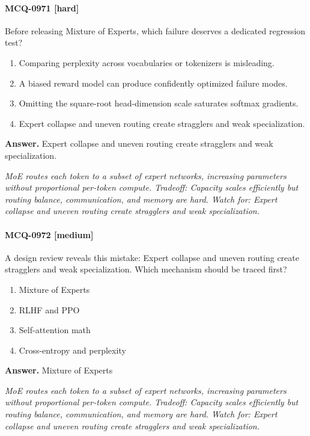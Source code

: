 \paragraph{MCQ-0971 [hard]} Before releasing Mixture of Experts, which failure deserves a dedicated regression test?
\begin{enumerate}[label=\Alph*.]
\item Comparing perplexity across vocabularies or tokenizers is misleading.
\item A biased reward model can produce confidently optimized failure modes.
\item Omitting the square-root head-dimension scale saturates softmax gradients.
\item Expert collapse and uneven routing create stragglers and weak specialization.
\end{enumerate}
\noindent\textbf{Answer.} Expert collapse and uneven routing create stragglers and weak specialization.
\par\textit{MoE routes each token to a subset of expert networks, increasing parameters without proportional per-token compute. Tradeoff: Capacity scales efficiently but routing balance, communication, and memory are hard. Watch for: Expert collapse and uneven routing create stragglers and weak specialization.}
\paragraph{MCQ-0972 [medium]} A design review reveals this mistake: Expert collapse and uneven routing create stragglers and weak specialization. Which mechanism should be traced first?
\begin{enumerate}[label=\Alph*.]
\item Mixture of Experts
\item RLHF and PPO
\item Self-attention math
\item Cross-entropy and perplexity
\end{enumerate}
\noindent\textbf{Answer.} Mixture of Experts
\par\textit{MoE routes each token to a subset of expert networks, increasing parameters without proportional per-token compute. Tradeoff: Capacity scales efficiently but routing balance, communication, and memory are hard. Watch for: Expert collapse and uneven routing create stragglers and weak specialization.}
